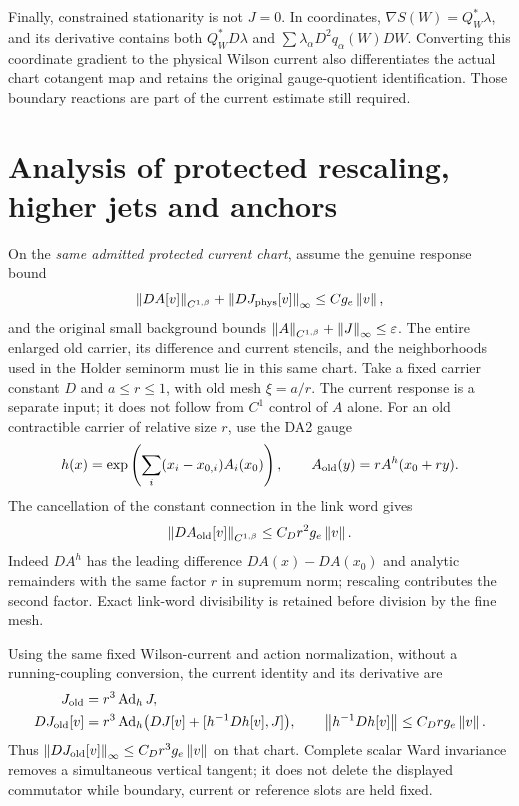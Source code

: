 \documentclass[11pt,letterpaper]{article}
\numberwithin{equation}{section}
\theoremstyle{plain}
\theoremstyle{remark}\newtheorem{remark}[theorem]{Scope}
\newcommand{\norm}[1]{\left\lVert#1\right\rVert}
\begin{document}
Finally, constrained stationarity is not $J=0$. In coordinates,
$\nabla S(W)=Q_W^*\lambda$, and its derivative contains both
$Q_W^*D\lambda$ and $\sum\lambda_\alpha D^2q_\alpha(W)DW$.
Converting this coordinate gradient to the physical Wilson current also
differentiates the actual chart cotangent map and retains the original
gauge-quotient identification. Those boundary reactions
are part of the current estimate still required.

\section{Analysis of protected rescaling, higher jets and anchors}

On the \emph{same admitted protected current chart}, assume the genuine
response bound
\begin{equation}
 \norm{DA[v]}_{C^{1,\beta}}+\norm{DJ_{\rm phys}[v]}_\infty
 \le Cg_e\norm v,
 \label{eq:protectedresponse}
\end{equation}
and the original small background bounds
$\norm A_{C^{1,\beta}}+\norm J_\infty\le\eps$.
The entire enlarged old carrier, its difference and current stencils,
and the neighborhoods used in the Holder seminorm must lie in this same
chart. Take a fixed carrier constant $D$ and $a\le r\le1$, with old mesh
$\xi=a/r$. The current response is a
separate input; it does not follow from $C^1$ control of $A$ alone.
For an old contractible carrier of relative size $r$, use the DA2 gauge
\[
 h(x)=\exp\left(\sum_i(x_i-x_{0,i})A_i(x_0)\right),\qquad
 A_{\rm old}(y)=rA^h(x_0+ry).
\]
The cancellation of the constant connection in the link word gives
\begin{equation}
 \norm{DA_{\rm old}[v]}_{C^{1,\beta}}
 \le C_Dr^2g_e\norm v.
 \label{eq:oldfield}
\end{equation}
Indeed $DA^h$ has the leading difference
$DA(x)-DA(x_0)$ and analytic remainders with the same factor $r$ in
supremum norm; rescaling contributes the second factor. Exact link-word
divisibility is retained before division by the fine mesh.

Using the same fixed Wilson-current and action normalization, without a
running-coupling conversion, the current identity and its derivative are
\begin{align}
 J_{\rm old}&=r^3\Ad_hJ,\\
 DJ_{\rm old}[v]
 &=r^3\Ad_h\bigl(DJ[v]+[h^{-1}Dh[v],J]\bigr),
 \qquad \norm{h^{-1}Dh[v]}\le C_Drg_e\norm v.
 \label{eq:oldcurrent}
\end{align}
Thus $\norm{DJ_{\rm old}[v]}_\infty\le C_Dr^3g_e\norm v$ on that chart.
Complete scalar Ward invariance removes a simultaneous vertical tangent;
it does not delete the displayed commutator while boundary, current or
reference slots are held fixed.
\end{document}
